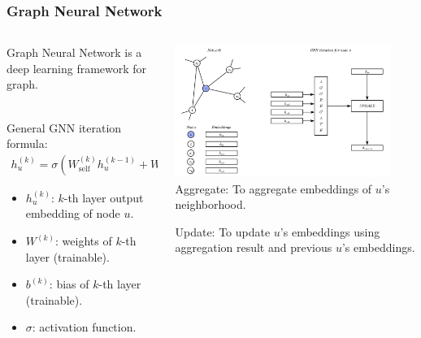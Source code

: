 \documentclass[10pt, aspectratio=169]{beamer}
\begin{document}
\begin{frame}
    \frametitle{Graph Neural Network}
    \begin{columns}
        \begin{column}{0.5\textwidth}
            Graph Neural Network is a deep learning framework for graph.\par ~\\
            General GNN iteration formula:
            \begin{align*}
                \displaystyle
                h_u^{(k)} = \sigma (W_{\text{self}}^{(k)} h_u^{(k-1)} + W_n^{(k)}\sum_{v\in N(u)} h_v^{(k-1)} + b^{(k)} ) 
            \end{align*}
            \begin{itemize}
                \item[] $h_u^{(k)}$: $k$-th layer output embedding of node $u$.
                \item[] $W^{(k)}$: weights of $k$-th layer (trainable).
                \item[] $b^{(k)}$: bias of $k$-th layer (trainable).
                \item[] $\sigma$: activation function.
            \end{itemize}
        \end{column}
        \begin{column}{0.5\textwidth}
            \includegraphics[width=7cm]{./graphics/gnn.png}
            Aggregate: To aggregate embeddings of $u$’s neighborhood.\par \vspace{0.2cm}
            Update: To update $u$’s embeddings using aggregation result and previous $u$’s embeddings.
        \end{column}
    \end{columns}
\end{frame}
\end{document}
